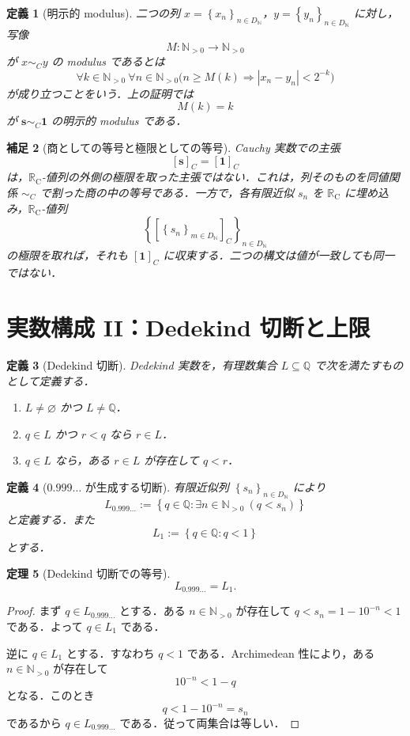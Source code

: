 \documentclass[a4paper,11pt]{ltjsarticle}
\theoremstyle{jpdef}
\newtheorem{definition}{定義}[section]
\newtheorem{remark}[definition]{補足}
\theoremstyle{jpthm}
\newtheorem{theorem}[definition]{定理}
\newcommand{\N}{\mathbb{N}}
\newcommand{\Q}{\mathbb{Q}}
\newcommand{\Ns}{\N_{>0}}
\newcommand{\DN}{D_{\N}}
\newcommand{\set}[1]{\left\{#1\right\}}
\newcommand{\seq}[2]{\left\{#1\right\}_{#2}}
\newcommand{\RealC}{\mathbb{R}_{\mathrm C}}
\begin{document}
\begin{definition}[明示的 modulus]
二つの列 \(x=\seq{x_n}{n\in\DN}\)，\(y=\seq{y_n}{n\in\DN}\) に対し，写像
\[
  M:\Ns\to\Ns
\]
が \(x\sim_C y\) の modulus であるとは
\[
  \forall k\in\Ns\ \forall n\in\Ns
  \bigl(n\ge M(k)\Rightarrow |x_n-y_n|<2^{-k}\bigr)
\]
が成り立つことをいう．上の証明では
\[
  M(k)=k
\]
が \(\mathbf s\sim_C\mathbf1\) の明示的 modulus である．
\end{definition}

\begin{remark}[商としての等号と極限としての等号]
Cauchy 実数での主張
\[
  [\mathbf s]_C=[\mathbf1]_C
\]
は，\(\RealC\)-値列の外側の極限を取った主張ではない．これは，列そのものを同値関係 \(\sim_C\) で割った商の中の等号である．一方で，各有限近似 \(s_n\) を \(\RealC\) に埋め込み，\(\RealC\)-値列
\[
  \seq{[\seq{s_n}{m\in\DN}]_C}{n\in\DN}
\]
の極限を取れば，それも \([\mathbf1]_C\) に収束する．二つの構文は値が一致しても同一ではない．
\end{remark}

\section{実数構成 II：Dedekind 切断と上限}

\begin{definition}[Dedekind 切断]
Dedekind 実数を，有理数集合 \(L\subseteq\Q\) で次を満たすものとして定義する．
\begin{enumerate}
\item \(L\ne\varnothing\) かつ \(L\ne\Q\)．
\item \(q\in L\) かつ \(r<q\) なら \(r\in L\)．
\item \(q\in L\) なら，ある \(r\in L\) が存在して \(q<r\)．
\end{enumerate}
\end{definition}

\begin{definition}[\(0.999\ldots\) が生成する切断]
有限近似列 \(\seq{s_n}{n\in\DN}\) により
\[
  L_{0.999\ldots}:=
  \set{q\in\Q:\exists n\in\Ns\ (q<s_n)}
\]
と定義する．また
\[
  L_1:=\set{q\in\Q:q<1}
\]
とする．
\end{definition}

\begin{theorem}[Dedekind 切断での等号]
\[
  L_{0.999\ldots}=L_1.
\]
\end{theorem}

\begin{proof}
まず \(q\in L_{0.999\ldots}\) とする．ある \(n\in\Ns\) が存在して \(q<s_n=1-10^{-n}<1\) である．よって \(q\in L_1\) である．

逆に \(q\in L_1\) とする．すなわち \(q<1\) である．Archimedean 性により，ある \(n\in\Ns\) が存在して
\[
  10^{-n}<1-q
\]
となる．このとき
\[
  q<1-10^{-n}=s_n
\]
であるから \(q\in L_{0.999\ldots}\) である．従って両集合は等しい．
\end{proof}
\end{document}
